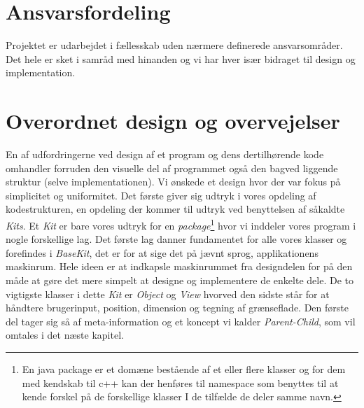 \documentclass[]{article}
\begin{document}
	\section{Ansvarsfordeling}
	
	Projektet er udarbejdet i fællesskab uden nærmere definerede ansvarsområder. Det hele er sket i samråd med hinanden og vi har hver især bidraget til design og implementation.
	
	\section{Overordnet design og overvejelser}
	
	En af udfordringerne ved design af et program og dens dertilhørende kode omhandler forruden den visuelle del af programmet også den bagved liggende struktur (selve implementationen). Vi ønskede et design hvor der var fokus på simplicitet og uniformitet. Det første giver sig udtryk i vores opdeling af kodestrukturen, en opdeling der kommer til udtryk ved benyttelsen af såkaldte \textit{Kits}. Et \textit{Kit} er bare vores udtryk for en \textit{package}\footnote{En java package er et domæne bestående af et eller flere klasser og for dem med kendskab til c++ kan der henføres til namespace som benyttes til at kende forskel på de forskellige klasser I de tilfælde de deler samme navn.} hvor vi inddeler vores program i nogle forskellige lag. Det første lag danner fundamentet for alle vores klasser og forefindes i \textit{BaseKit}, det er for at sige det på jævnt sprog, applikationens maskinrum. Hele ideen er at indkapsle maskinrummet fra designdelen for på den måde at gøre det mere simpelt at designe og implementere de enkelte dele. De to vigtigste klasser i dette \textit{Kit} er \textit{Object} og \textit{View} hvorved den sidste står for at håndtere brugerinput, position, dimension og tegning af grænseflade. Den første del tager sig så af meta-information og et koncept vi kalder \textit{Parent-Child}, som vil omtales i det næste kapitel.
\end{document}
